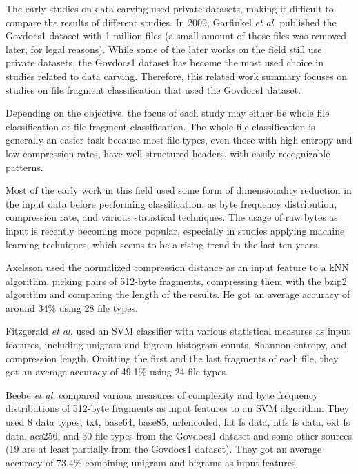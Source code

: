 The early studies on data carving  used private datasets, making it difficult to compare the results of different studies. In 2009, Garfinkel \textit{et al.} \cite{garfinkel_bringing_2009} published the Govdocs1 dataset with 1 million files (a small amount of those files was removed later, for legal reasons). While some of the later works on the field still use private datasets, the Govdocs1 dataset has become the most used choice in studies related to data carving.
Therefore, this related work summary focuses on studies on file fragment classification that used the Govdocs1 dataset.

Depending on the objective, the focus of each study may either be whole file classification or file fragment classification. The whole file classification is generally an easier task because most file types, even those with high entropy and low compression rates, have well-structured headers, with easily recognizable patterns.

Most of the early work in this field used some form of dimensionality reduction in the input data before performing classification, as byte frequency distribution, compression rate, and various statistical techniques. The usage of raw bytes as input is recently becoming more popular, especially in studies applying machine learning techniques, which seems to be a rising trend in the last ten years.


Axelsson \cite{axelsson_normalised_2010} used the normalized compression distance as an input feature to a kNN algorithm, picking pairs of 512-byte fragments, compressing them with the bzip2 algorithm and comparing the length of the results.
He got an average accuracy of around 34\% using 28 file types.

Fitzgerald \textit{et al.} \cite{fitzgerald_using_2012}  used an SVM classifier with various statistical measures as input features, including unigram and bigram histogram counts, Shannon entropy, and compression length.
Omitting the first and the last fragments of each file, they got an average accuracy of 49.1\% using 24 file types.

Beebe \textit{et al.} \cite{beebe_sceadan:_2013}
compared various measures of complexity and byte frequency distributions of 512-byte fragments as input features to an SVM algorithm. They used 8 data types, txt, base64, base85, urlencoded, fat fs data, ntfs fs data, ext fs data, aes256, and
30 file types
from the Govdocs1 dataset and some other sources (19 are at least partially from the Govdocs1 dataset). They got an average accuracy of 73.4\% combining unigram and bigrams as input features.

